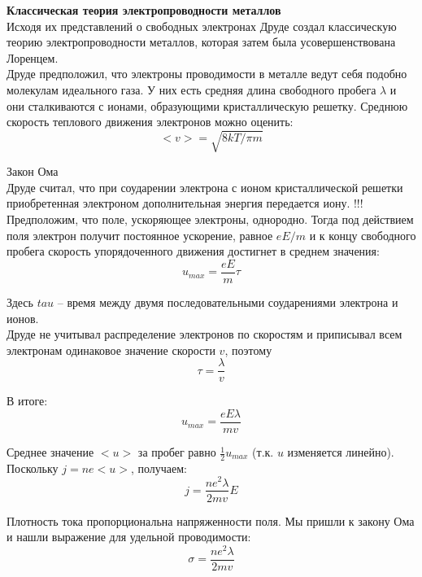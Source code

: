 \documentclass{article}
\begin{document}
	
	\textbf{Классическая теория электропроводности металлов}\\

	Исходя их представлений о свободных электронах Друде создал классическую теорию электропроводности металлов, которая затем была усовершенствована Лоренцем.\\

	Друде предположил, что электроны проводимости в металле ведут себя подобно молекулам идеального газа. У них есть средняя длина свободного пробега $\lambda$ и они сталкиваются с ионами, образующими кристаллическую решетку. Среднюю скорость теплового движения электронов можно оценить:
	\begin{equation}
		<v>=\sqrt{8kT/\pi m}
	\end{equation}

	Закон Ома\\

	Друде считал, что при соударении электрона с ионом кристаллической решетки приобретенная электроном дополнительная энергия передается иону. !!! Предположим, что поле, ускоряющее электроны, однородно. Тогда под действием поля электрон получит постоянное ускорение, равное $eE/m$ и к концу свободного пробега скорость упорядоченного движения достигнет в среднем значения:
	\begin{equation}
		u_{max} = \frac{eE}{m}\tau
	\end{equation}

	Здесь $tau$ -- время между двумя последовательными соударениями электрона и ионов.\\

	Друде не учитывал распределение электронов по скоростям и приписывал всем электронам одинаковое значение скорости $v$, поэтому
	\begin{equation}
		\tau = \frac{\lambda}{v}
	\end{equation}

	В итоге:
	\begin{equation}
		u_{max} = \frac{eE\lambda}{mv}
	\end{equation}

	Среднее значение $<u>$ за пробег равно $\frac{1}{2}u_{max}$ (т.к. $u$ изменяется линейно).\\

	Поскольку $j = ne<u>$, получаем:
	\begin{equation}
		j = \frac{ne^2\lambda}{2mv}E
	\end{equation}

	Плотность тока пропорциональна напряженности поля. Мы пришли к закону Ома и нашли выражение для удельной проводимости:
	\begin{equation}
		\sigma = \frac{ne^2\lambda}{2mv}
	\end{equation}
\end{document}
